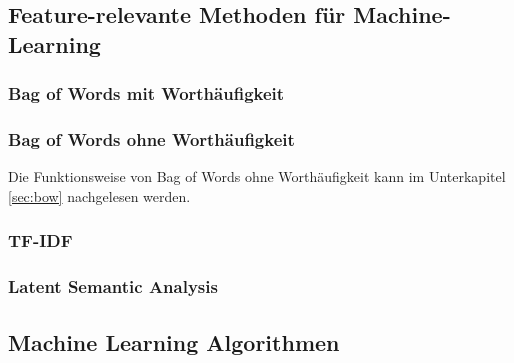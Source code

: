 \subsection{Feature-relevante Methoden für Machine-Learning}
\subsubsection{Bag of Words mit Worthäufigkeit}
\subsubsection{Bag of Words ohne Worthäufigkeit}
Die Funktionsweise von Bag of Words ohne Worthäufigkeit kann im Unterkapitel \ref{sec:bow} nachgelesen werden.
\subsubsection{TF-IDF}

\subsubsection{Latent Semantic Analysis}

\subsection{Machine Learning Algorithmen}
